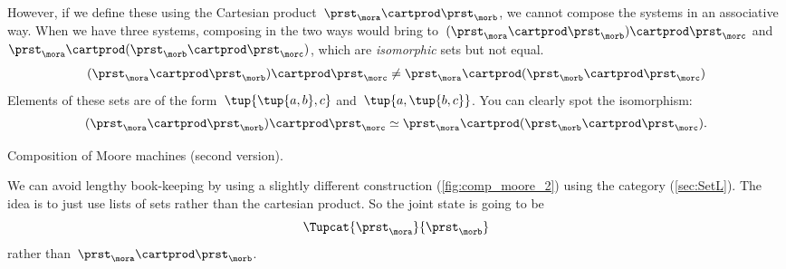 However, if we define these using the Cartesian product~$\prst_{\mora} \cartprod \prst_{\morb}$, we cannot compose the systems in an associative way.
When we have three systems, composing in the two ways would bring to~$(\prst_{\mora} \cartprod \prst_{\morb}) \cartprod \prst_{\morc}$ and~$\prst_{\mora} \cartprod (\prst_{\morb} \cartprod \prst_{\morc})$, which are \emph{isomorphic} sets but not equal.
%
\begin{equation}
    \label{eq:assoc-fails1}
    (\prst_{\mora} \cartprod \prst_{\morb}) \cartprod \prst_{\morc} \neq \prst_{\mora} \cartprod (\prst_{\morb} \cartprod \prst_{\morc})
\end{equation}
%
Elements of these sets are of the form~$\tup{\tup{a,b},c}$ and~$\tup{a, \tup{b,c}}$.
%
You can clearly spot the isomorphism:
%
\begin{equation}
    \label{eq:assoc-fails2}
    (\prst_{\mora} \cartprod \prst_{\morb}) \cartprod \prst_{\morc} \simeq \prst_{\mora} \cartprod (\prst_{\morb} \cartprod \prst_{\morc}).
\end{equation}
%

\begin{marginfigure}
    \centering
    \caption{Composition of Moore machines (second version).}
    \label{fig:comp_moore_2}
\end{marginfigure}

We can avoid lengthy book-keeping by using a slightly different construction (\cref{fig:comp_moore_2}) using the \SetL category (\cref{sec:SetL}).
%
The idea is to just use lists of sets rather than the cartesian product.
So the joint state is going to be
\begin{equation}
    \label{eq:moore-comp-good-joint}
    \Tupcat {\prst_{\mora}}   {\prst_{\morb}}
\end{equation}
rather than~$\prst_{\mora} \cartprod \prst_{\morb}$.

